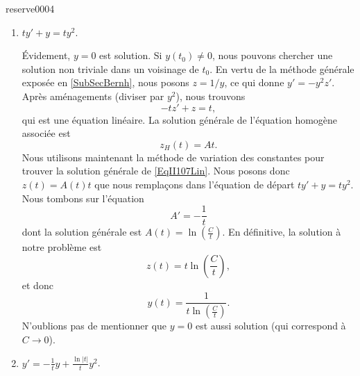 
\begin{corrige}{reserve0004}

\begin{enumerate}

\item
$ty'+y=ty^2$. 

Évidement, $y=0$ est solution. Si $y(t_0)\neq 0$, nous pouvons chercher une solution non triviale dans un voisinage de $t_0$. En vertu de la méthode générale exposée en \ref{SubSecBernh}, nous posons $z=1/y$, ce qui donne $y'=-y^2z'$. Après aménagements (diviser par $y^2$), nous trouvons
\begin{equation}		\label{EqII107Lin}
	-tz'+z=t,
\end{equation}
qui est une équation linéaire. La solution générale de l'équation homogène associée est
\begin{equation}
	z_H(t)=At.
\end{equation}
Nous utilisons maintenant la méthode de variation des constantes pour trouver la solution générale de \eqref{EqII107Lin}. Nous posons donc $z(t)=A(t)t$ que nous remplaçons dans l'équation de départ $ty'+y=ty^2$. Nous tombons sur l'équation
\begin{equation}
	A'=-\frac{1}{ t }
\end{equation}
dont la solution générale est $A(t)=\ln\left( \frac{ C }{ t } \right)$. En définitive, la solution à notre problème est
\begin{equation}
	z(t)=t\ln\left( \frac{ C }{ t } \right),
\end{equation}
et donc
\begin{equation}
	y(t)=\frac{1}{ t\ln\left( \frac{ C }{ t } \right) }.
\end{equation}
N'oublions pas de mentionner que $y=0$ est aussi solution (qui correspond à $C\to 0$).

\item
$y'=-\frac{1}{ t }y+\frac{ \ln| t | }{ t }y^2$.


\end{enumerate}
\end{corrige}
